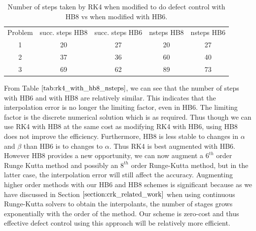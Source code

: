 \begin{table}[h]
\caption {Number of steps taken by RK4 when modified to do defect control with HB8 vs when modified with HB6.} \label{tab:rk4_with_hb8_nsteps}
\begin{center}
\begin{tabular}{ c c c c c } 
Problem & succ. steps HB8 & succ. steps HB6 & nsteps HB8 & nsteps HB6 \\ 
1       & 20                 &        27          & 20         & 27\\ 
2       & 37                 &        36          & 60         & 40\\
3       & 69                 &        62          & 89         & 73\\
\end{tabular}
\end{center}
\end{table}

From Table $\ref{tab:rk4_with_hb8_nsteps}$, we can see that the number of steps with HB6 and with HB8 are relatively similar. This indicates that the interpolation error is no longer the limiting factor, even in HB6. The limiting factor is the discrete numerical solution which is as required. Thus though we can use RK4 with HB8 at the same cost as modifying RK4 with HB6, using HB8 does not improve the efficiency. Furthermore, HB8 is less stable to changes in $\alpha$ and $\beta$ than HB6 is to changes to $\alpha$. Thus RK4 is best augmented with HB6. However HB8 provides a new opportunity, we can now augment a $6^{th}$ order Runge Kutta method and possibly an $8^{th}$ order Runge-Kutta method, but in the latter case, the interpolation error will still affect the accuracy. Augmenting higher order methods with our HB6 and HB8 schemes is significant because as we have discussed in Section $\ref{section:crk_related_work}$ when using continuous Runge-Kutta solvers to obtain the interpolants, the number of stages grows exponentially with the order of the method. Our scheme is zero-cost and thus effective defect control using this approach will be relatively more efficient.